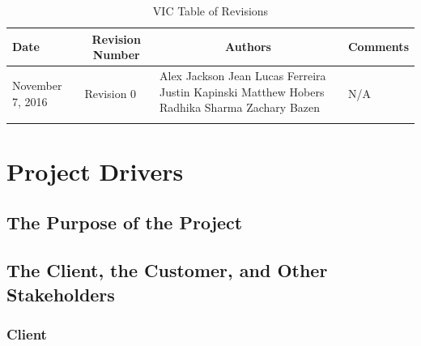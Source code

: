 \documentclass [12pt]{article}
\begin{document}
\thispagestyle{empty}
\begin{longtable}{| p{ } | p{ } | p{ } | p{ } |}

\hline 
\centering \textbf{Date} & 
\multicolumn{1}{c}{\textbf {Revision Number}} &
\multicolumn{1}{|c}{\textbf {Authors}} & 
\multicolumn{1}{|c|}{\textbf {Comments}} \\ \hline

\multirow{4}{*}{\centering November 7, 2016}  & 
\multirow{4}{*}{Revision 0}& 
{Alex Jackson \newline
Jean Lucas Ferreira \newline
Justin Kapinski\newline
Matthew Hobers\newline
Radhika Sharma\newline
Zachary Bazen}
&
 \multirow{4}{*}{N/A} \\ 
\hline 

\caption{VIC Table of Revisions} 
\end{longtable}
\pagebreak



\section {\textbf{Project Drivers}}


\subsection{The Purpose of the Project} 
\lipsum [1] %

\subsection{The Client, the Customer, and Other Stakeholders}

\subsubsection{Client}
\lipsum[1]  %
\end{document}

